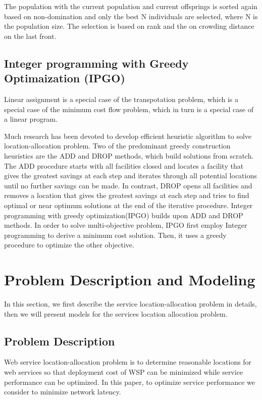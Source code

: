 \documentclass{llncs}
\begin{document}
The population with the current population and current offsprings is sorted again based on non-domination and only the best N individuals are selected, where N is the population size.
The selection is based on rank and the on crowding distance on the last front.

\subsection{Integer programming with Greedy Optimaization (IPGO)}

Linear assignment \cite{lawler1963quadratic} is a special case of the transpotation problem, which is a special case of the minimum cost flow problem, which
in turn is a special case of a linear program.

Much research has been devoted to develop efficient heuristic algorithm to solve location-allocation problem. Two of the predominant
greedy construction heuristics are the ADD and DROP \cite{Sun} methods, which build solutions from scratch. 
The ADD procedure starts with all facilities closed and locates a facility that gives the greatest savings at each step and 
iterates through all potential locations until no further savings can be made. In contrast, DROP opens all facilities and removes a 
location that gives the greatest savings at each step and tries to find optimal or near optimum solutions at the end of the 
iterative procedure. Integer programming with greedy optimization(IPGO) builds upon ADD and DROP methods. 
In order to solve multi-objective problem, IPGO first employ Integer programming to derive a minimum cost solution. Then, it
uses a greedy procedure to optimize the other objective.




\section{Problem Description and Modeling}
\label{sec:problem}
In this section, we first describe the service location-allocation problem in details, then we will present models for the services location allocation problem.

\subsection{Problem Description}
Web service location-allocation problem is to determine reasonable locations for web services so that deployment cost of WSP can be minimized while service performance can be optimized.
In this paper, to optimize service performance we consider to minimize network latency.
\end{document}
